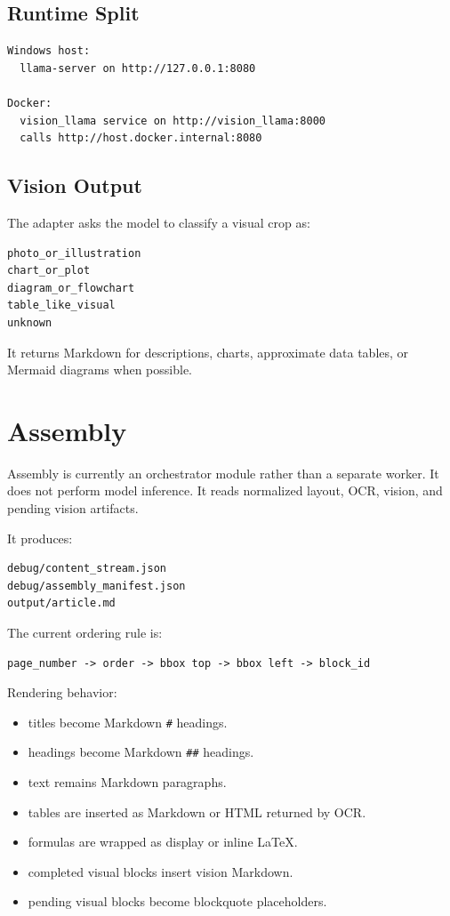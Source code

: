 \documentclass[11pt,a4paper]{article}
\begin{document}
\subsection{Runtime Split}

\begin{lstlisting}
Windows host:
  llama-server on http://127.0.0.1:8080

Docker:
  vision_llama service on http://vision_llama:8000
  calls http://host.docker.internal:8080
\end{lstlisting}

\subsection{Vision Output}

The adapter asks the model to classify a visual crop as:

\begin{lstlisting}
photo_or_illustration
chart_or_plot
diagram_or_flowchart
table_like_visual
unknown
\end{lstlisting}

It returns Markdown for descriptions, charts, approximate data tables, or
Mermaid diagrams when possible.

\section{Assembly}

Assembly is currently an orchestrator module rather than a separate worker. It
does not perform model inference. It reads normalized layout, OCR, vision, and
pending vision artifacts.

It produces:

\begin{lstlisting}
debug/content_stream.json
debug/assembly_manifest.json
output/article.md
\end{lstlisting}

The current ordering rule is:

\begin{lstlisting}
page_number -> order -> bbox top -> bbox left -> block_id
\end{lstlisting}

Rendering behavior:

\begin{itemize}[leftmargin=1.2cm]
\item titles become Markdown \texttt{\#} headings.
\item headings become Markdown \texttt{\#\#} headings.
\item text remains Markdown paragraphs.
\item tables are inserted as Markdown or HTML returned by OCR.
\item formulas are wrapped as display or inline LaTeX.
\item completed visual blocks insert vision Markdown.
\item pending visual blocks become blockquote placeholders.
\end{itemize}
\end{document}
